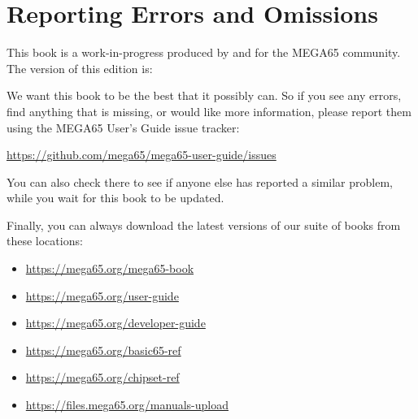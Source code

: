 \chapter*{Reporting Errors and Omissions}

This book is a work-in-progress produced by and for the MEGA65 community.
The version of this edition is:



We want this book to be the best that it possibly can. So if you see any errors,
find anything that is missing, or would like more information,
please report them using the MEGA65 User's Guide issue tracker:

\url{https://github.com/mega65/mega65-user-guide/issues}

You can also check there to see if anyone else has reported a similar problem,
while you wait for this book to be updated.

Finally, you can always download the latest versions of our suite of books from these locations:

\begin{itemize}
\item \url{https://mega65.org/mega65-book}
\item \url{https://mega65.org/user-guide}
\item \url{https://mega65.org/developer-guide}
\item \url{https://mega65.org/basic65-ref}
\item \url{https://mega65.org/chipset-ref}
\item \url{https://files.mega65.org/manuals-upload}
\end{itemize}
